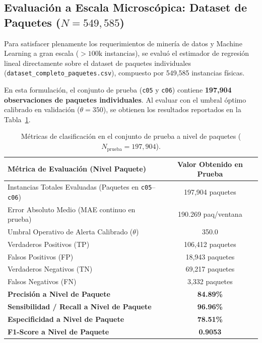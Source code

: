 \documentclass[11pt,a4paper]{article}
\begin{document}
\subsection{\texorpdfstring{Evaluación a Escala Microscópica: Dataset de Paquetes ($N = 549,585$)}{Evaluación a Escala Microscópica: Dataset de Paquetes (N = 549,585)}}
Para satisfacer plenamente los requerimientos de minería de datos y Machine Learning a gran escala ($>100\text{k}$ instancias), se evaluó el estimador de regresión lineal directamente sobre el dataset de paquetes individuales (\texttt{dataset\_completo\_paquetes.csv}), compuesto por 549,585 instancias físicas.

En esta formulación, el conjunto de prueba (\texttt{c05} y \texttt{c06}) contiene \textbf{197,904 observaciones de paquetes individuales}. Al evaluar con el umbral óptimo calibrado en validación ($\theta = 350$), se obtienen los resultados reportados en la Tabla~\ref{tab:metricas_paquetes}.

\begin{table}[H]
\centering
\small
\caption{Métricas de clasificación en el conjunto de prueba a nivel de paquetes ($N_{\text{prueba}} = 197,904$).}
\label{tab:metricas_paquetes}
\begin{tabular}{lc}
\toprule
\textbf{Métrica de Evaluación (Nivel Paquete)} & \textbf{Valor Obtenido en Prueba} \\
\midrule
Instancias Totales Evaluadas (Paquetes en \texttt{c05}--\texttt{c06}) & 197,904 paquetes \\
Error Absoluto Medio (MAE continuo en prueba) & 190.269 paq/ventana \\
Umbral Operativo de Alerta Calibrado ($\theta$) & 350.0 \\
\midrule
Verdaderos Positivos (TP) & 106,412 paquetes \\
Falsos Positivos (FP) & 18,943 paquetes \\
Verdaderos Negativos (TN) & 69,217 paquetes \\
Falsos Negativos (FN) & 3,332 paquetes \\
\midrule
\textbf{Precisión a Nivel de Paquete} & \textbf{84.89\%} \\
\textbf{Sensibilidad / Recall a Nivel de Paquete} & \textbf{96.96\%} \\
\textbf{Especificidad a Nivel de Paquete} & \textbf{78.51\%} \\
\textbf{F1-Score a Nivel de Paquete} & \textbf{0.9053} \\
\bottomrule
\end{tabular}
\end{table}
\end{document}
